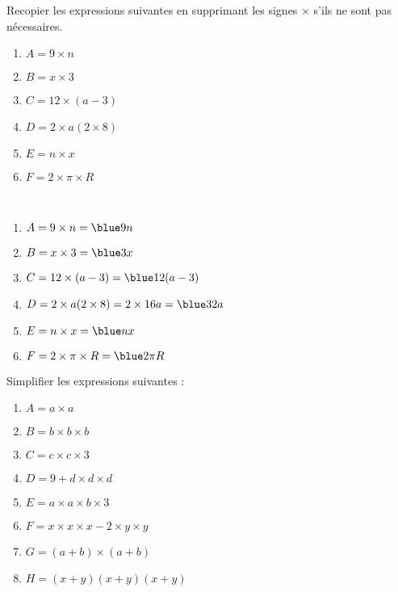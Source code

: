 \begin{colonne*exercice}
\bigskip


\begin{exercice} %
Recopier les expressions suivantes en supprimant les signes $\times$ s'ils ne sont pas nécessaires.
\begin{enumerate}
   \item $A =9\times n$
   \item $B =x\times3$
   \item $C =12\times(a-3)$
   \item $D =2\times a(2\times8)$
   \item $E =n\times x$
   \item $F =2\times\pi\times R$
\end{enumerate}
\end{exercice}

\begin{corrige}
   \ \\ [-5mm]
   \begin{enumerate}
      \item $A =9\times n =\blue9n$
      \item $B =x\times3 =\blue3x$
      \item $C =12\times(a-3) =\blue12(a-3)$
      \item $D =2\times a(2\times8) =2\times16a =\blue32a$
      \item $E =n\times x =\blue nx$
      \item $F =2\times\pi\times R =\blue2\pi R$
\end{enumerate}
\end{corrige}

\bigskip

\begin{exercice} %
   Simplifier les expressions suivantes :
   \begin{enumerate}
      \item $A =a\times a$
      \item $B =b\times b\times b$
      \item $C =c\times c\times3$
      \item $D =9+d\times d\times d$
      \item $E =a\times a\times b\times3$
      \item $F =x\times x\times x-2\times y\times y$
      \item $G =(a+b)\times(a+b)$
      \item $H =(x+y)(x+y)(x+y)$
   \end{enumerate}
\end{exercice}


\end{colonne*exercice}
